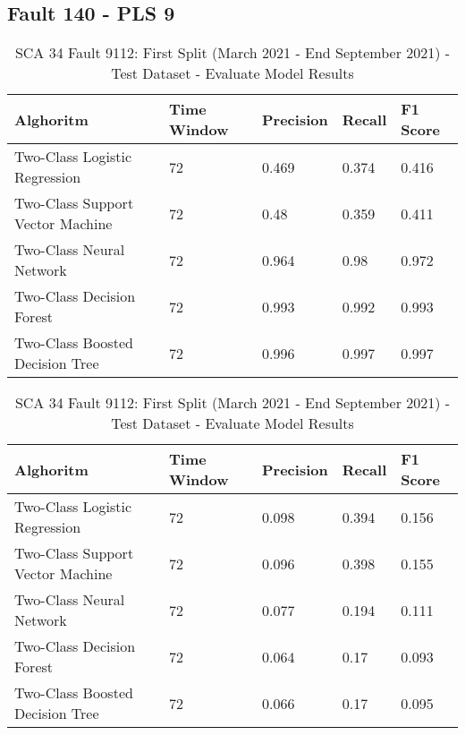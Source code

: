 \subsection{Fault 140 - PLS 9}

\begin{table}[!ht]
    \centering
    \begin{tabular}{|l|l|l|l|l|}
    \hline
        Alghoritm & Time Window & Precision & Recall & F1 Score \\ \hline
        Two-Class Logistic Regression & 72 & 0.469 & 0.374 & 0.416 \\ \hline
        Two-Class Support Vector Machine & 72 & 0.48 & 0.359 & 0.411 \\ \hline
        Two-Class Neural Network & 72 & 0.964 & 0.98 & 0.972 \\ \hline
        Two-Class Decision Forest & 72 & 0.993 & 0.992 & 0.993 \\ \hline
        Two-Class Boosted Decision Tree & 72 & 0.996 & 0.997 & 0.997 \\ \hline
    \end{tabular}
    \caption{SCA 34 Fault 9112: First Split (March 2021 - End September 2021) - Test Dataset - Evaluate Model Results}
    \label{9112_SCA34_1st}
\end{table}

\begin{table}[!ht]
    \centering
    \begin{tabular}{|l|l|l|l|l|}
    \hline
        Alghoritm & Time Window & Precision & Recall & F1 Score \\ \hline
        Two-Class Logistic Regression & 72 & 0.098 & 0.394 & 0.156 \\ \hline
        Two-Class Support Vector Machine & 72 & 0.096 & 0.398 & 0.155 \\ \hline
        Two-Class Neural Network & 72 & 0.077 & 0.194 & 0.111 \\ \hline
        Two-Class Decision Forest & 72 & 0.064 & 0.17 & 0.093 \\ \hline
        Two-Class Boosted Decision Tree & 72 & 0.066 & 0.17 & 0.095 \\ \hline
    \end{tabular}
    \caption{SCA 34 Fault 9112: First Split (March 2021 - End September 2021) - Test Dataset - Evaluate Model Results}
    \label{9112_SCA34_1st}
\end{table}

